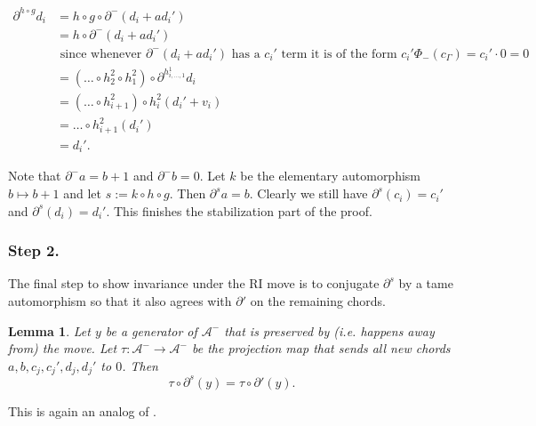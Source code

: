\documentclass[11pt]{amsart}
\makeatletter
\renewenvironment{proof}[1][\proofname] {\par\pushQED{\qed}{\normalfont\bfseries\topsep6\p@\@plus6\p@\relax #1\@addpunct{.} }}{\popQED\endtrivlist\@endpefalse}
\theoremstyle{mystyle}
\newtheorem{lemma}[lemma]{Lemma}
\newcommand{\<}{\langle}
\renewcommand{\>}{\rangle}
\makeatother
\begin{document}
\begin{proof}
\begin{align*}
		\partial^{h \circ g} d_i &= h \circ g \circ \partial^-(d_i + ad_i') \\
		&= h \circ \partial^-(d_i + ad_i') \\
        &\text{ since whenever } \partial^-(d_i + ad_i') \text{ has a } c_i' \text{ term  it is of the form } c_i' \Phi_-(c_\Gamma) = c_i' \cdot 0 = 0 \\
		&= (\dots  \circ h_2^2 \circ h_1^2) \circ \partial^{h_{i, \dots , 1}^1} d_i \\
		&= (\dots  \circ h_{i+1}^2) \circ h_i^2 (d_i' + v_i) \\
		&= \dots  \circ h_{i+1}^2 (d_i') \\
		&= d_i'.
	\end{align*}
	
	
	Note that $\partial^- a = b + 1$ and $\partial^- b = 0$. Let $k$ be the elementary automorphism $b \mapsto b + 1$ and let $s := k \circ h \circ g$. Then $\partial^s a = b$. Clearly we still have $\partial^s (c_i) = c_i'$ and $\partial^s (d_i) = d_i'$. This finishes the stabilization part of the proof. \\
	
	\subsubsection*{Step 2.} The final step to show invariance under the RI move is to conjugate $\partial^s$ by a tame automorphism so that it also agrees with $\partial'$ on the remaining chords.
	
	\begin{lemma}\label{keyProjection}
		Let $y$ be a generator of $\mathcal{A}^-$ that is preserved by (i.e. happens away from) the move. Let $\tau: \mathcal{A}^- \rightarrow \mathcal{A}^-$ be the projection map that sends all new chords $a, b, c_j, c_j', d_j, d_j'$ to $0$. Then \[\tau \circ \partial^s(y) = \tau \circ \partial'(y).\]
	\end{lemma}
	
	\begin{proof}
        This is again an analog of \cite[Lem. 8.2(b)]{chekanov2002dga}.

       
        

\end{proof}
\end{proof}
\end{document}
